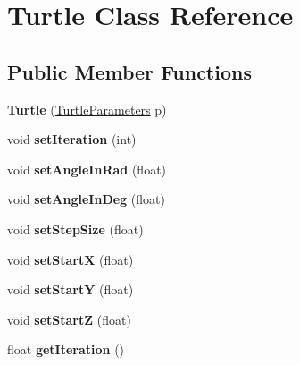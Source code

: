 \hypertarget{class_turtle}{}\section{Turtle Class Reference}
\label{class_turtle}
\subsection*{Public Member Functions}
\begin{DoxyCompactItemize}
\item 
\mbox{\label{class_turtle_af2c7b7605fa068d48d11d7fc7dcf16d2}} 
{\bfseries Turtle} (\hyperlink{struct_turtle_parameters}{Turtle\+Parameters} p)
\item 
\mbox{\label{class_turtle_a71cfbebfc8ea7af1065e6de2c68213af}} 
void {\bfseries set\+Iteration} (int)
\item 
\mbox{\label{class_turtle_a4f369b7f631f48d8d71416b63c5aaeeb}} 
void {\bfseries set\+Angle\+In\+Rad} (float)
\item 
\mbox{\label{class_turtle_a765645581dac004ca03a84cdbbc7e700}} 
void {\bfseries set\+Angle\+In\+Deg} (float)
\item 
\mbox{\label{class_turtle_ac1909bbfd89d3a9681047ff9de343835}} 
void {\bfseries set\+Step\+Size} (float)
\item 
\mbox{\label{class_turtle_a7cbf8bbc57d085e524de404594b7d8ef}} 
void {\bfseries set\+StartX} (float)
\item 
\mbox{\label{class_turtle_a26c647422bd39ea891fa51659b7c94a3}} 
void {\bfseries set\+StartY} (float)
\item 
\mbox{\label{class_turtle_a00e95bf6ff7ebc51fe1975b74df6bc60}} 
void {\bfseries set\+StartZ} (float)
\item 
\mbox{\label{class_turtle_af5d74038d2ca75731b75a8a25b050f40}} 
float {\bfseries get\+Iteration} ()
\item 
\mbox{\label{class_turtle_aca66f0691bb0649a00e6838f58e46d4a}} 

\end{DoxyCompactItemize}

